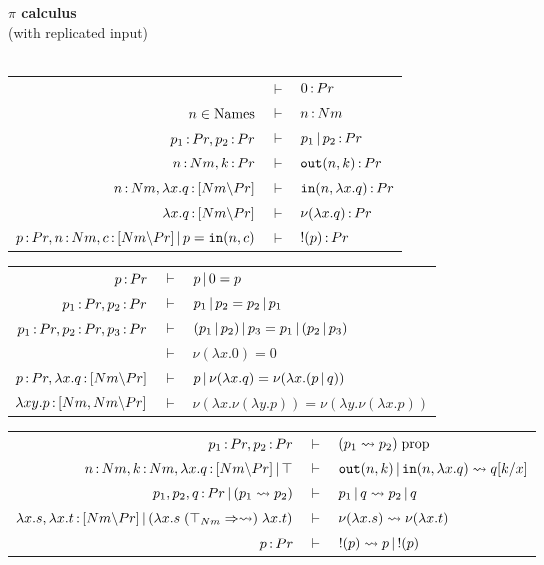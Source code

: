 \documentclass{article}
\begin{document}
\newpage

\begin{mdframed}
    \begin{center}
    \textbf{$\pi$ calculus}\\
    (with replicated input)
    \\~\\
    \renewcommand{\arraystretch}{1.2}
        \begin{tabular}{rcl}
             & $\vdash$ & $0\,{:}\, Pr$\\
             $n\in \mathrm{Names}$ & $\vdash$ & $n\,{:}\, Nm$\\
             $p_1\,{:}\, Pr, p_2\,{:}\, Pr$ & $\vdash$ & $p_1\,|\, p_2\,{:}\, Pr$\\
             $n\,{:}\, Nm, k\,{:}\, Pr$ & $\vdash$ & $\mathtt{out}(n,k)\,{:}\, Pr$\\
             $n\,{:}\, Nm, \lambda x.q\,{:}\, [Nm{\setminus} Pr]$ & $\vdash$ & $\mathtt{in}(n,\lambda x.q)\,{:}\, Pr$\\
             $\lambda x.q\,{:}\, [Nm{\setminus} Pr]$ & $\vdash$ & $\nu(\lambda x.q)\,{:}\, Pr$\\
             $p\,{:}\, Pr, n\,{:}\, Nm, c\,{:}\, [Nm{\setminus} Pr]\,|\, p=\mathtt{in}(n,c)$ & $\vdash$ & $!(p)\,{:}\, Pr$
        \end{tabular}

        \vspace{1em}

        \begin{tabular}{rcl}
            $p\,{:}\, Pr$ & $\vdash$ & $p\,|\, 0 = p$\\
            $p_1\,{:}\, Pr, p_2\,{:}\, Pr$ & $\vdash$ & $p_1\,|\, p_2 = p_2\,|\, p_1$\\
            $p_1\,{:}\, Pr,p_2\,{:}\, Pr,p_3\,{:}\, Pr$ & $\vdash$ & $(p_1\,|\, p_2)\,|\, p_3 = p_1\,|\, (p_2\,|\, p_3)$\\
            & $\vdash$ & $\nu(\lambda x.0) = 0$\\
            $p\,{:}\, Pr, \lambda x.q\,{:}\, [Nm{\setminus} Pr]$ & $\vdash$ & $p\,|\, \nu(\lambda x.q) = \nu(\lambda x.(p\,|\, q))$\\
            $\lambda xy.p\,{:}\, [Nm,Nm{\setminus} Pr]$ & $\vdash$ & $\nu(\lambda x.\nu(\lambda y.p)) = \nu(\lambda y.\nu(\lambda x.p))$
        \end{tabular}

        \vspace{1em}

        \begin{tabular}{rcl}
             $p_1\,{:}\, Pr,p_2\,{:}\, Pr$ & $\vdash$ & $(p_1\rightsquigarrow p_2)\; \mathrm{prop}$\\
             $n\,{:}\, Nm, k\,{:}\, Nm, \lambda x.q\,{:}\, [Nm{\setminus} Pr]\,|\, \top$ & $\vdash$ & $\mathtt{out}(n,k)\,|\, \mathtt{in}(n,\lambda x.q)\rightsquigarrow  q[k/x]$\\
             $p_1,p_2,q\,{:}\, Pr\,|\, (p_1\rightsquigarrow p_2)$ & $\vdash$ & $ p_1\,|\, q\rightsquigarrow  p_2\,|\, q$\\
             $\lambda x.s, \lambda x.t\,{:}\, [Nm{\setminus} Pr] \,|\, (\lambda x.s \;(\top_{Nm}\Rightarrow \rightsquigarrow)\; \lambda x.t)$ & $\vdash$ & $\nu(\lambda x.s)\rightsquigarrow \nu(\lambda x.t)$\\
            $p\,{:}\, Pr$ & $\vdash$ & $!(p) \rightsquigarrow p\,|\, !(p)$
        \end{tabular}
    \end{center}
\end{mdframed}
\end{document}
